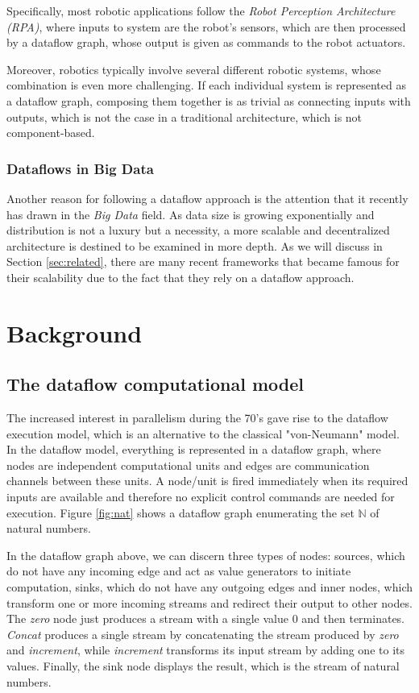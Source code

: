 \documentclass[sigplan,review,anonymous]{acmart}\settopmatter{printfolios=true,printacmref=false}
\begin{document}
Specifically, most robotic applications follow the \textit{Robot Perception Architecture (RPA)}, where inputs to system are the robot's sensors, which are then processed by a dataflow graph, whose output is given as commands to the robot actuators.

Moreover, robotics typically involve several different robotic systems, whose combination is even more challenging. If each individual system is represented as a dataflow graph, composing them together is as trivial as connecting inputs with outputs, which is not the case in a traditional architecture, which is not component-based.

\subsubsection{Dataflows in Big Data}

Another reason for following a dataflow approach is the attention that it recently has drawn in the \textit{Big Data} field. As data size is growing exponentially and distribution is not a luxury but a necessity, a more scalable and decentralized architecture is destined to be examined in more depth. As we will discuss in Section \ref{sec:related}, there are many recent frameworks that became famous for their scalability due to the fact that they rely on a dataflow approach.

\section{Background} \label{sec:background}

\subsection{The dataflow computational model}
The increased interest in parallelism during the 70's gave rise to the dataflow execution model, which is an alternative to the classical "von-Neumann" model. In the dataflow model, everything is represented in a dataflow graph, where nodes are independent computational units  and edges are communication channels between these units. A node/unit is fired immediately when its required inputs are available and therefore no explicit control commands are needed for execution. Figure \ref{fig:nat} shows a dataflow graph enumerating the set $\mathbb{N}$ of natural numbers.


In the dataflow graph above, we can discern three types of nodes: sources, which do not have any incoming edge and act as value generators to initiate computation, sinks, which do not have any outgoing edges and inner nodes, which transform one or more incoming streams and redirect their output to other nodes. The \textit{zero} node just produces a stream with a single value 0 and then terminates. \textit{Concat} produces a single stream by concatenating the stream produced by \textit{zero} and \textit{increment}, while \textit{increment} transforms its input stream by adding one to its values. Finally, the sink node displays the result, which is the stream of natural numbers.
\end{document}
